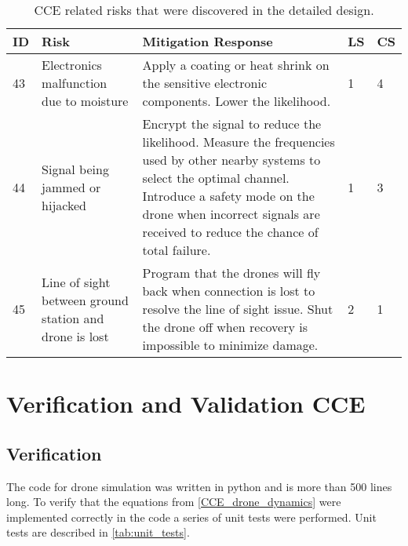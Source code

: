 \begin{table}[H]
\centering
\caption{CCE related risks that were discovered in the detailed design.}
\label{tab:newmitigationCCE}
\begin{scriptsize}
\begin{tabular}{|p{0.4cm}|p{3cm}|p{9.2cm}|p{0.4cm}|p{0.4cm}|} 
\hline
\textbf{ID} & \textbf{Risk} & \textbf{Mitigation Response} & \textbf{LS} & \textbf{CS} \\ \hline
43 & Electronics malfunction due to moisture & Apply a coating or heat shrink on the sensitive electronic components. Lower the likelihood. & 1 & 4 \\ \hline
44 &  Signal being jammed or hijacked & Encrypt the signal to reduce the likelihood. Measure the frequencies used by other nearby systems to select the optimal channel. Introduce a safety mode on the drone when incorrect signals are received to reduce the chance of total failure. & 1 & 3 \\ \hline
45 &  Line of sight between ground station and drone is lost & Program that the drones will fly back when connection is lost to resolve the line of sight issue. Shut the drone off when recovery is impossible to minimize damage. & 2 & 1 \\ \hline
\end{tabular}
\end{scriptsize}
\end{table}







\section{Verification and Validation CCE} \label{sec:cce_verification_validation}

\subsection{Verification}

\label{sec:cce_verification}
The code for drone simulation was written in python and is more than 500 lines long. To verify that the equations from \autoref{CCE_drone_dynamics} were implemented correctly in the code a series of unit tests were performed. Unit tests are described in \autoref{tab:unit_tests}. 


